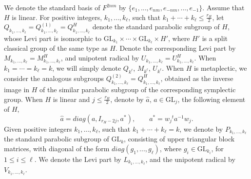 \documentclass[12pts]{amsart}
\newcommand{\GL}{{\mathrm{GL}}}
\begin{document}
We denote the standard basis of $F^{2nm}$ by $\{e_1,...,e_{nm}, e_{-nm},...,e_{-1}\}$.
Assume that $H$ is linear. For positive integers, $k_1,...,k_\ell$, such that
$k_1+\cdots+k_\ell\leq \frac{r_H}{2}$, let
$Q_{k_1,...,k_\ell}=Q^{(1)}_{k_1,...,k_\ell}=Q_{k_1,...,k_\ell}^H$ denote the standard
parabolic subgroup of $H$, whose Levi part is isomorphic to
$\GL_{k_1}\times\cdots\times \GL_{k_\ell}\times H'$, where $H'$ is a split
classical group of the same type as $H$. Denote the corresponding
Levi part by $M_{k_1,...,k_\ell}=M_{k_1,...,k_\ell}^H$, and
unipotent radical by $U_{k_1,...,k_\ell}=U_{k_1,...,k_\ell}^H$. When
$k_1=\cdots=k_\ell=k$, we will simply denote $Q_{k^\ell}$,
$M_{k^\ell}$, $U_{k^\ell}$. When $H$ is metaplectic, we consider the analogous subgroups $Q^{(2)}_{k_1,...,k_\ell}=Q^H_{k_1,...,k_\ell}$, obtained as the inverse image in $H$ of the similar parabolic subgroup of the corresponding symplectic group. 
When $H$ is linear and $j\leq \frac{r_H}{2}$, denote by $\hat{a}$, $a\in
\GL_j$, the following element of $H$,
\begin{equation}\label{1'.15}
\hat{a}=diag(a,I_{r_H-2j},a^*),\quad\quad a^*=w_j{}^ta^{-1}w_j.
\end{equation}
Given positive integers $k_1,...,k_\ell$, such that
$k_1+\cdots+k_\ell=k$, we denote by $P_{k_1,...,k_\ell}$ the
standard parabolic subgroup of $\GL_k$, consisting of upper
triangular block matrices, with diagonal of the form
$diag(g_1,...,g_\ell)$, where $g_i\in\GL_{k_i}$, for $1\leq i\leq
\ell$. We denote the Levi part by $L_{k_1,...,k_\ell}$, and the unipotent radical by
$V_{k_1,...,k_\ell}$.
\end{document}
